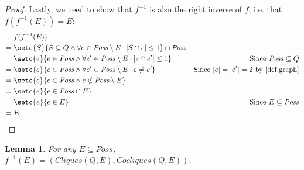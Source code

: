 \documentclass{report}
\DeclarePairedDelimiter{\abs}{\lvert}{\rvert}
\newtheorem{lemma}[theorem]{Lemma}
\theoremstyle{definition}
\begin{document}
\begin{proof}
Lastly, we need to show that $f^{-1}$ is also the right inverse of $f$,
i.e. that $f(f^{-1}(E)) = E$:
\begin{align*}
& f(f^{-1}(E)) \\
= \ & \setc{S}{S \subseteq Q \wedge \forall e \in \mathit{Poss} \setminus E \cdot
\abs{S \cap e} \leq 1} \cap \mathit{Poss} \\
= \ & \setc{e}{e \in \mathit{Poss} \wedge \forall e' \in \mathit{Poss} \setminus E \cdot
\abs{e \cap e'} \leq 1}
& \text{Since } \mathit{Poss} \subseteq Q \\
= \ & \setc{e}{e \in \mathit{Poss} \wedge \forall e' \in \mathit{Poss} \setminus E \cdot
e \neq e'}
& \text{Since } \abs{e} = \abs{e'} = 2 \text{ by \cref{def.graph}} \\
= \ & \setc{e}{e \in \mathit{Poss} \wedge e \notin \mathit{Poss} \setminus E} \\
= \ & \setc{e}{e \in \mathit{Poss} \cap E} \\
= \ & \setc{e}{e \in E}
& \text{Since } E \subseteq \mathit{Poss} \\
= \ & E
\end{align*}
\end{proof}

\begin{lemma} \label{lma.max_comp_bijection_inverse_cliques}
For any $E \subseteq \mathit{Poss}$, $f^{-1}(E) = (\mathit{Cliques}(Q, E), \mathit{Cocliques}(Q, E))$.
\end{lemma}
\end{document}
